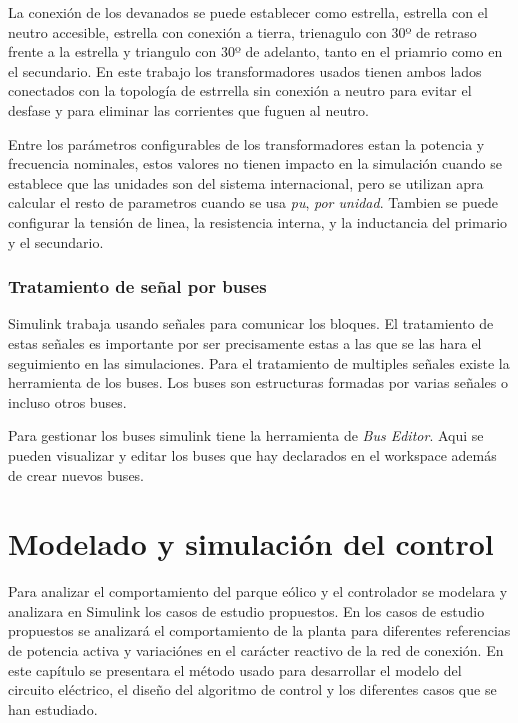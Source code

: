 \documentclass{book}
\begin{document}
La conexi\'on de los devanados se puede establecer como estrella, estrella con el neutro accesible, estrella con conexi\'on a tierra, trienagulo con 30º de retraso frente a la estrella y triangulo con 30º de adelanto,  tanto en el priamrio como en el secundario. En este trabajo los transformadores usados tienen ambos lados conectados con la topolog\'ia de estrrella sin conexi\'on a neutro para evitar el desfase y para eliminar las corrientes que fuguen al neutro. \par

Entre los par\'ametros configurables de los transformadores estan la potencia y frecuencia nominales, estos valores no tienen impacto en la simulaci\'on cuando se establece que las unidades son del sistema internacional, pero se utilizan apra calcular el resto de parametros cuando se usa \emph{pu}, \emph{por unidad}. Tambien se puede configurar la tensi\'on de linea, la resistencia interna, y la inductancia del primario y el secundario. \par

		\subsection{Tratamiento de señal por buses}

Simulink trabaja usando señales para comunicar los bloques. El tratamiento de estas señales es importante por ser precisamente estas a las que se las hara el seguimiento en las simulaciones. Para el tratamiento de multiples señales existe la herramienta de los buses. Los buses son estructuras formadas por varias señales o incluso otros buses. \par

Para gestionar los buses simulink tiene la herramienta de \emph{Bus Editor}. Aqui se pueden visualizar y editar los buses que hay declarados en el workspace adem\'as de crear nuevos buses.


\chapter{Modelado y simulaci\'on del control}

Para analizar el comportamiento del parque e\'olico y el controlador se modelara y analizara en Simulink los casos de estudio propuestos. En los casos de estudio propuestos se analizar\'a el comportamiento de la planta para diferentes referencias de potencia activa y variaci\'ones en el car\'acter reactivo de la red de conexi\'on. En este cap\'itulo se presentara el m\'etodo usado para desarrollar el modelo del circuito el\'ectrico, el diseño del algoritmo de control y los diferentes casos que se han estudiado. \par
\end{document}
